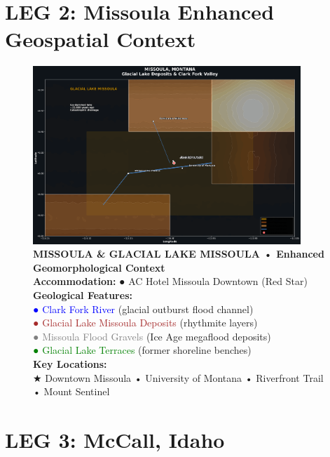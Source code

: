 \documentclass[
  10pt,
]{article}
\begin{document}
\newpage

\section{\texorpdfstring{\textcolor{primary}{LEG 2: Missoula Enhanced Geospatial Context}}{}}\label{section-16}

\begin{figure}[h]
\centering
\includegraphics[width=0.9\textwidth]{images/missoula_enhanced_geospatial.png}
\caption{\textbf{\textcolor{primary}{MISSOULA & GLACIAL LAKE MISSOULA • Enhanced Geomorphological Context}} \\ 
\textbf{\textcolor{secondary}{Accommodation:}} \textcolor{mapred}{●} AC Hotel Missoula Downtown (Red Star) \\
\textbf{\textcolor{secondary}{Geological Features:}} \\
\textcolor{blue}{●} \textcolor{blue}{Clark Fork River} (glacial outburst flood channel) \\
\textcolor{brown}{●} \textcolor{brown}{Glacial Lake Missoula Deposits} (rhythmite layers) \\
\textcolor{gray}{●} \textcolor{gray}{Missoula Flood Gravels} (Ice Age megaflood deposits) \\
\textcolor{green}{●} \textcolor{green}{Glacial Lake Terraces} (former shoreline benches) \\
\textbf{\textcolor{secondary}{Key Locations:}} \\
\textcolor{mapred}{★} Downtown Missoula • University of Montana • Riverfront Trail • Mount Sentinel}
\end{figure}

\newpage

\section{\texorpdfstring{\textcolor{primary}{LEG 3: McCall, Idaho}}{}}\label{section-17}
\end{document}
